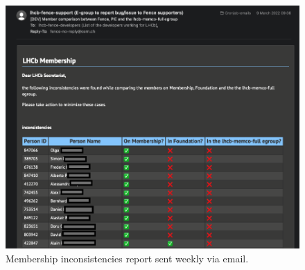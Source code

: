 \begin{figure} [H]
    \centering
    \includegraphics[width=0.8\linewidth]{figuras/email_report.png}
    \caption{Membership inconsistencies report sent weekly via email.}
    \label{fig:email_report}
\end{figure}